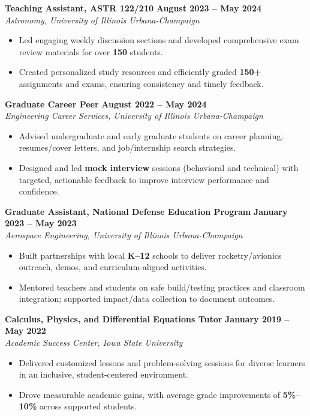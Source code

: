 \documentclass[10pt]{article}
\begin{document}
	\textbf{Teaching Assistant, ASTR 122/210} \hfill \textbf{August 2023 -- May 2024} \\
	\emph{Astronomy, University of Illinois Urbana-Champaign}
	\begin{itemize}
		\item Led engaging weekly discussion sections and developed comprehensive exam review materials for over \textbf{150} students.
		\item Created personalized study resources and efficiently graded \textbf{150+} assignments and exams, ensuring consistency and timely feedback.
	\end{itemize}
	
	\textbf{Graduate Career Peer} \hfill \textbf{August 2022 -- May 2024} \\
	\emph{Engineering Career Services, University of Illinois Urbana-Champaign}
	\begin{itemize}
		\item Advised undergraduate and early graduate students on career planning, resumes/cover letters, and job/internship search strategies.
		\item Designed and led \textbf{mock interview} sessions (behavioral and technical) with targeted, actionable feedback to improve interview performance and confidence.
	\end{itemize}

	\textbf{Graduate Assistant, National Defense Education Program} \hfill \textbf{January 2023 -- May 2023} \\
	\emph{Aerospace Engineering, University of Illinois Urbana-Champaign}
	\begin{itemize}
		\item Built partnerships with local \textbf{K--12} schools to deliver rocketry/avionics outreach, demos, and curriculum-aligned activities.
		\item Mentored teachers and students on safe build/testing practices and classroom integration; supported impact/data collection to document outcomes.
	\end{itemize}
	
	\textbf{Calculus, Physics, and Differential Equations Tutor} \hfill \textbf{January 2019 -- May 2022} \\
	\emph{Academic Success Center, Iowa State University}
	\begin{itemize}
		\item Delivered customized lessons and problem-solving sessions for diverse learners in an inclusive, student-centered environment.
		\item Drove measurable academic gains, with average grade improvements of \textbf{5\%--10\%} across supported students.
	\end{itemize}
\end{document}
